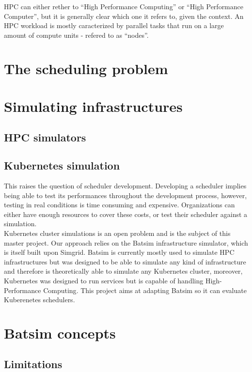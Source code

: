 \documentclass[12pt]{report}
\begin{document}
HPC can either rether to ``High Performance Computing'' or ``High Performance
Computer'', but it is generally clear which one it refers to, given the
context.
An HPC workload is mostly caracterized by parallel tasks that run on a large
amount of compute units - refered to as ``nodes''.




\section{The scheduling problem}

\section{Simulating infrastructures}
\subsection{HPC simulators}
\subsection{Kubernetes simulation}

This raises the question of scheduler development. Developing a scheduler
implies being able to test its performances throughout the development process,
however, testing in real conditions is time consuming and expensive.
Organizations can either have enough resources to cover these costs, or test
their scheduler against a simulation.\\

Kubernetes cluster simulations is an open problem and is the subject of this
master project. Our approach relies on the Batsim\cite{batsim} infrastructure
simulator, which is itself built upon Simgrid\cite{simgrid}. Batsim is
currently mostly used to simulate HPC infrastructures but was designed to be
able to simulate any kind of infrastructure and therefore is theoretically able
to simulate any Kubernetes cluster, moreover, Kubernetes was designed to run
services but is capable of handling High-Performance
Computing\cite{kube-for-hpc}. This project aims at adapting Batsim so it can
evaluate Kuberenetes schedulers.

\section{Batsim concepts}

\subsection{Limitations}
\end{document}

